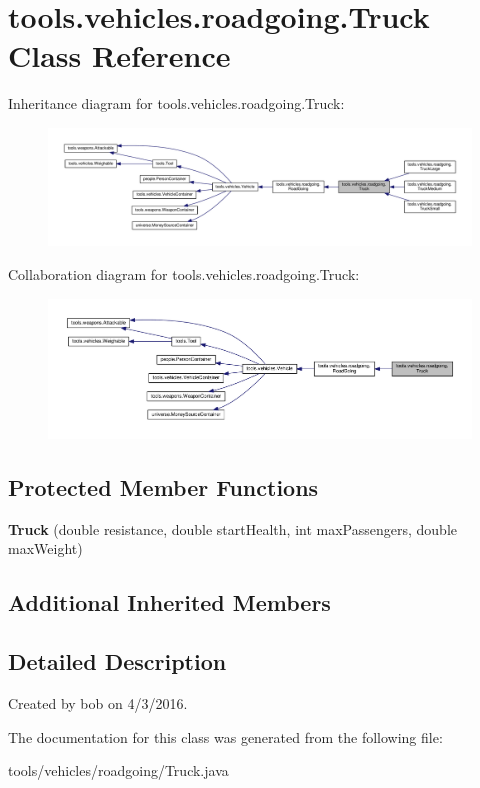 \hypertarget{classtools_1_1vehicles_1_1roadgoing_1_1_truck}{}\section{tools.\+vehicles.\+roadgoing.\+Truck Class Reference}
\label{classtools_1_1vehicles_1_1roadgoing_1_1_truck}


Inheritance diagram for tools.\+vehicles.\+roadgoing.\+Truck\+:
\nopagebreak
\begin{figure}[H]
\begin{center}
\leavevmode
\includegraphics[width=350pt]{classtools_1_1vehicles_1_1roadgoing_1_1_truck__inherit__graph}
\end{center}
\end{figure}


Collaboration diagram for tools.\+vehicles.\+roadgoing.\+Truck\+:
\nopagebreak
\begin{figure}[H]
\begin{center}
\leavevmode
\includegraphics[width=350pt]{classtools_1_1vehicles_1_1roadgoing_1_1_truck__coll__graph}
\end{center}
\end{figure}
\subsection*{Protected Member Functions}
\begin{DoxyCompactItemize}
\item 
{\bfseries Truck} (double resistance, double start\+Health, int max\+Passengers, double max\+Weight)\hypertarget{classtools_1_1vehicles_1_1roadgoing_1_1_truck_ae59d10c3921233e3360ca316af442420}{}\label{classtools_1_1vehicles_1_1roadgoing_1_1_truck_ae59d10c3921233e3360ca316af442420}

\end{DoxyCompactItemize}
\subsection*{Additional Inherited Members}


\subsection{Detailed Description}
Created by bob on 4/3/2016. 

The documentation for this class was generated from the following file\+:\begin{DoxyCompactItemize}
\item 
tools/vehicles/roadgoing/Truck.\+java\end{DoxyCompactItemize}
